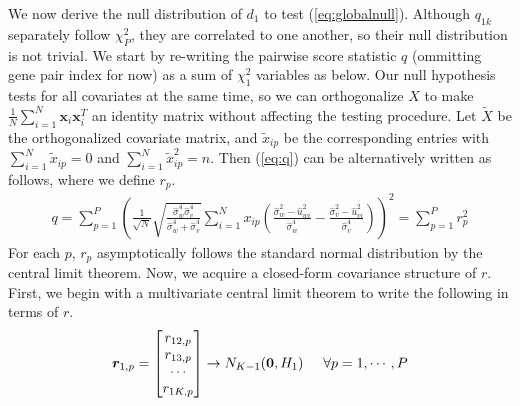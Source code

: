 \documentclass[aoas,preprint]{imsart}
\numberwithin{equation}{section}
\theoremstyle{plain}
\begin{document}
We now derive the null distribution of $d_1$ to test (\ref{eq:globalnull}). Although ${q}_{1k}$ separately follow $\chi_{P}^2$, they are correlated to one another, so their null distribution is not trivial. We start by re-writing the pairwise score statistic $q$ (ommitting gene pair index for now) as a sum of $\chi_1^2$ variables as below. Our null hypothesis tests for all covariates at the same time, so we can orthogonalize $X$ to make $\frac{1}{N} \sum_{i=1}^{N} \bm{x}_i \bm{x}_i^T$ an identity matrix without affecting the testing procedure. Let $\tilde{X}$ be the orthogonalized covariate matrix, and $\tilde{x}_{ip}$ be the corresponding entries with $\sum_{i=1}^{N}\tilde{x}_{ip} = 0$ and $\sum_{i=1}^{N} \tilde{x}_{ip}^2  = n$. Then (\ref{eq:q}) can be alternatively written as follows, where we define $r_{p}.$
\begin{align}
q = \sum_{p=1}^{P}
 \left(\frac{1}{\sqrt{N}}
 \sqrt{\frac{\hat{\sigma}_w^4 \hat{\sigma}_v^4}{\hat{\sigma}_w^4 + \hat{\sigma}_v^4}}
 \sum_{i=1}^{N} x_{ip} \left( \frac{\hat{\sigma}_w^2 - \hat{u}_{wi}^2}{\hat{\sigma}_w^4}
 - \frac{\hat{\sigma}_v^2 - \hat{u}_{vi}^2}{\hat{\sigma}_v^4}
 \right)
\right)^2 = \sum_{p=1}^{P}r_p^2
\label{eq:r}
\end{align}
For each $p$, $r_p$ asymptotically follows the standard normal distribution by the central limit theorem. 
 Now, we acquire a closed-form covariance structure of $r$. First, we begin with a multivariate central limit theorem to write the following in terms of $r$.
\begin{equation}
\bm{r}_{1,p} = \begin{bmatrix}
r_{12,p} \\ r_{13, p} \\ \cdots \\ r_{1K,p}
\end{bmatrix}  \rightarrow N_{K-1}(\bm{0}, H_1) \hspace{5mm} \forall p = 1, \cdots, P
\label{eq:H}
\end{equation}
\end{document}

